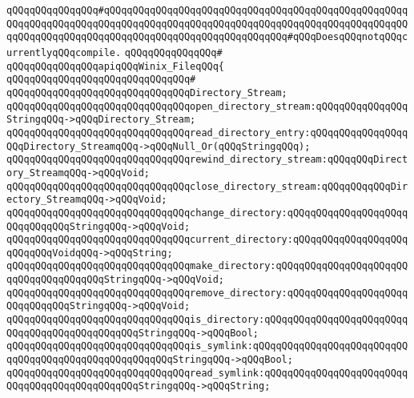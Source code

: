 \verb|qQQqqQQqqQQqqQQq#qQQqqQQqqQQqqQQqqQQq|\verb|qQQqqQQqqQQqqQQqqQQqqQQqqQQqqQQqqQQqqQQqqQQqqQQqqQQqqQQqqQQqqQQqqQQqqQQqqQQqqQQqqQQqqQQqqQQqqQQqqQQqqQQqqQQqqQQqqQQqqQQqqQQqqQQqqQQqqQQqqQQqqQQqqQQqqQQq#qQQqDoesqQQqnotqQQqcurrentlyqQQqcompile.|\newline
\verb|qQQqqQQqqQQqqQQq#|\newline
\verb|qQQqqQQqqQQqqQQqapiqQQqWinix_FileqQQq{|\newline
\verb|qQQqqQQqqQQqqQQqqQQqqQQqqQQqqQQq#|\newline
\verb|qQQqqQQqqQQqqQQqqQQqqQQqqQQqqQQqDirectory_Stream;|\newline
\newline
\verb|qQQqqQQqqQQqqQQqqQQqqQQqqQQqqQQqopen_directory_stream:qQQqqQQqqQQqqQQqStringqQQq->qQQqDirectory_Stream;|\newline
\verb|qQQqqQQqqQQqqQQqqQQqqQQqqQQqqQQqread_directory_entry:qQQqqQQqqQQqqQQqqQQqDirectory_StreamqQQq->qQQqNull_Or(qQQqStringqQQq);|\newline
\verb|qQQqqQQqqQQqqQQqqQQqqQQqqQQqqQQqrewind_directory_stream:qQQqqQQqDirectory_StreamqQQq->qQQqVoid;|\newline
\verb|qQQqqQQqqQQqqQQqqQQqqQQqqQQqqQQqclose_directory_stream:qQQqqQQqqQQqDirectory_StreamqQQq->qQQqVoid;|\newline
\newline
\verb|qQQqqQQqqQQqqQQqqQQqqQQqqQQqqQQqchange_directory:qQQqqQQqqQQqqQQqqQQqqQQqqQQqqQQqStringqQQq->qQQqVoid;|\newline
\verb|qQQqqQQqqQQqqQQqqQQqqQQqqQQqqQQqcurrent_directory:qQQqqQQqqQQqqQQqqQQqqQQqqQQqVoidqQQq->qQQqString;|\newline
\verb|qQQqqQQqqQQqqQQqqQQqqQQqqQQqqQQqmake_directory:qQQqqQQqqQQqqQQqqQQqqQQqqQQqqQQqqQQqqQQqStringqQQq->qQQqVoid;|\newline
\verb|qQQqqQQqqQQqqQQqqQQqqQQqqQQqqQQqremove_directory:qQQqqQQqqQQqqQQqqQQqqQQqqQQqqQQqStringqQQq->qQQqVoid;|\newline
\verb|qQQqqQQqqQQqqQQqqQQqqQQqqQQqqQQqis_directory:qQQqqQQqqQQqqQQqqQQqqQQqqQQqqQQqqQQqqQQqqQQqqQQqStringqQQq->qQQqBool;|\newline
\newline
\verb|qQQqqQQqqQQqqQQqqQQqqQQqqQQqqQQqis_symlink:qQQqqQQqqQQqqQQqqQQqqQQqqQQqqQQqqQQqqQQqqQQqqQQqqQQqqQQqStringqQQq->qQQqBool;|\newline
\verb|qQQqqQQqqQQqqQQqqQQqqQQqqQQqqQQqread_symlink:qQQqqQQqqQQqqQQqqQQqqQQqqQQqqQQqqQQqqQQqqQQqqQQqStringqQQq->qQQqString;|\newline
